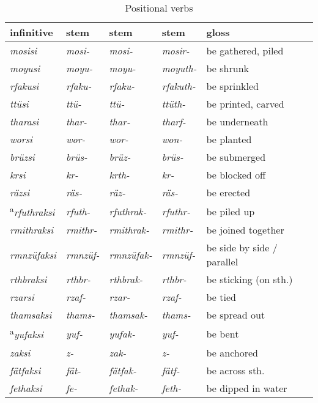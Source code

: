 \begin{table}
\caption{Positional verbs}
\label{positional.verbs}
{\small%
\begin{tabularx}{\textwidth}{lXXXl}
	\lsptoprule
	{infinitive} & \Pos{} {stem} & {\Ext} {stem} 	& {\Rs} {stem} 	& {gloss} \\\midrule
	\emph{mosisi} &\emph{mosi-} &\emph{mosi-} &\emph{mosir-} &be gathered, piled\\
	\emph{moyusi} &\emph{moyu-} &\emph{moyu-} &\emph{moyuth-} &be shrunk\\
	\emph{rfakusi} &\emph{rfaku-} &\emph{rfaku-} &\emph{rfakuth-} &be sprinkled\\
	\emph{ttüsi} &\emph{ttü-} &\emph{ttü-} &\emph{ttüth-} &be printed, carved\\
	\emph{tharasi} &\emph{thar-} &\emph{thar-} &\emph{tharf-} &be underneath\\
	\emph{worsi} &\emph{wor-} &\emph{wor-} &\emph{won-} &be planted\\\midrule
	\emph{brüzsi} &\emph{brüs-} &\emph{brüz-} &\emph{brüs-} &be submerged\\
	\emph{krsi} &\emph{kr-} &\emph{krth-} &\emph{kr-} &be blocked off\\
	\emph{räzsi} &\emph{räs-} &\emph{räz-} &\emph{räs-} &be erected\\
	\textsuperscript{a}\emph{rfuthraksi} &\emph{rfuth-} &\emph{rfuthrak-} &\emph{rfuthr-} &be piled up\\
	\emph{rmithraksi} &\emph{rmithr-} &\emph{rmithrak-}	&\emph{rmithr-} &be joined together\\
	\emph{rmnzüfaksi} &\emph{rmnzüf-} &\emph{rmnzüfak-}	&\emph{rmnzüf-} &be side by side / parallel\\
	\emph{rthbraksi} &\emph{rthbr-} &\emph{rthbrak-} &\emph{rthbr-} &be sticking (on sth.)\\
	\emph{rzarsi} &\emph{rzaf-} &\emph{rzar-} &\emph{rzaf-} &be tied\\
	\emph{thamsaksi} &\emph{thams-} &\emph{thamsak-} &\emph{thams-} &be spread out\\
	\textsuperscript{a}\emph{yufaksi} &\emph{yuf-} &\emph{yufak-} &\emph{yuf-} &be bent\\
	\emph{zaksi} &\emph{z-} &\emph{zak-} &\emph{z-} &be anchored\\\midrule
	\emph{fätfaksi} &\emph{fät-} &\emph{fätfak-} &\emph{fätf-} &be across sth.\\
	\emph{fethaksi} &\emph{fe-} &\emph{fethak-} &\emph{feth-} &be dipped in water\\

\end{tabularx}}
\end{table}
